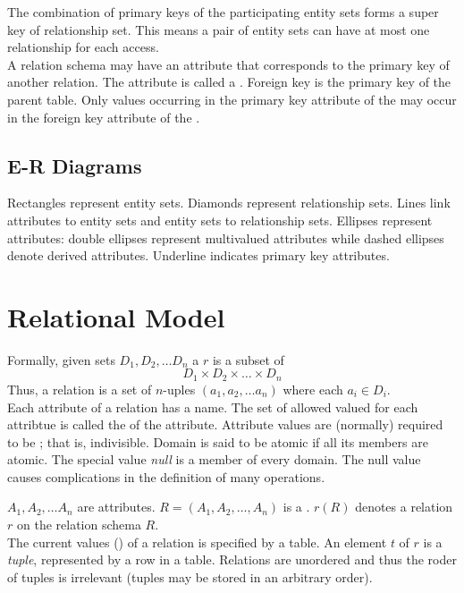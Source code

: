 \documentclass{article}
\begin{document}
The combination of primary keys of the participating entity sets forms a super key of relationship set. This means a pair of entity sets can have at most one relationship for each access. \\

A relation schema may have an attribute that corresponds to the primary key of another relation. The attribute is called a . Foreign key is the primary key of the parent table. Only values occurring in the primary key attribute of the  may occur in the foreign key attribute of the .  

\subsection{E-R Diagrams}

Rectangles represent entity sets. Diamonds represent relationship sets. Lines link attributes to entity sets and entity sets to relationship sets. Ellipses represent attributes: double ellipses represent multivalued attributes while dashed ellipses denote derived attributes. Underline indicates primary key attributes. 

\section{Relational Model}

Formally, given sets $D_1 , D_2 , \dots D_n$ a  $r$ is a subset of $$D_1 \times D_2 \times \dots \times D_n$$ Thus, a relation is a set of $n$-uples $(a_1 , a_2 , \dots a_n)$ where each $a_i \in D_i$. \\ 

Each attribute of a relation has a name. The set of allowed valued for each attribtue is called the  of the attribute. Attribute values are (normally) required to be ; that is, indivisible. Domain is said to be atomic if all its members are atomic. The special value \emph{null} is a member of every domain. The null value causes complications in the definition of many operations. 
 
$A_1 , A_2 , \dots A_n$ are attributes. $R= (A_1 , A_2 , \dots , A_n)$ is a . $r(R)$ denotes a relation $r$ on the relation schema $R$. \\ 

The current values () of a relation is specified by a table. An element $t$ of $r$ is a \emph{tuple}, represented by a row in a table. Relations are unordered and thus the roder of tuples is irrelevant (tuples may be stored in an arbitrary order). \\ 
\end{document}

